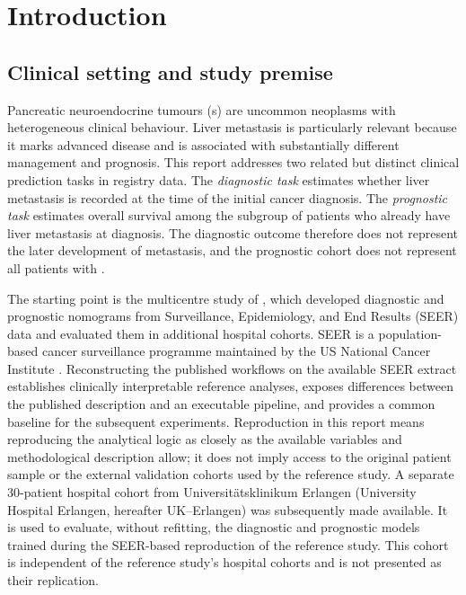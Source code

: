 \section{Introduction}
\label{sec:introduction}

\subsection{Clinical setting and study premise}
\label{sec:introduction:clinical}

Pancreatic neuroendocrine tumours (\pNET{}s) are uncommon neoplasms with
heterogeneous clinical behaviour. Liver metastasis is particularly relevant
because it marks advanced disease and is associated with substantially different
management and prognosis. This report addresses two related but distinct clinical
prediction tasks in registry data. The \emph{diagnostic task} estimates whether
liver metastasis is recorded at the time of the initial cancer diagnosis. The
\emph{prognostic task} estimates overall survival among the subgroup of patients
who already have liver metastasis at diagnosis. The diagnostic outcome therefore
does not represent the later development of metastasis, and the prognostic cohort
does not represent all patients with \pNET{}.

The starting point is the multicentre study of \citet{Li2023}, which developed
diagnostic and prognostic nomograms from Surveillance, Epidemiology, and End
Results (SEER) data and evaluated them in additional hospital cohorts. SEER is a
population-based cancer surveillance programme maintained by the US National
Cancer Institute \citep{NCISEER}. Reconstructing the published workflows on the
available SEER extract establishes clinically interpretable reference analyses,
exposes differences between the published description and an executable
pipeline, and provides a common baseline for the subsequent experiments.
Reproduction in this report means reproducing the analytical logic as closely as
the available variables and methodological description allow; it does not imply
access to the original patient sample or the external validation cohorts used by
the reference study. A separate 30-patient hospital cohort from
Universit\"atsklinikum Erlangen (University Hospital Erlangen, hereafter
UK--Erlangen) was subsequently made available. It is used to evaluate, without
refitting, the diagnostic and prognostic models trained during the SEER-based
reproduction of the reference study. This cohort is independent of the reference
study's hospital cohorts and is not presented as their replication.

